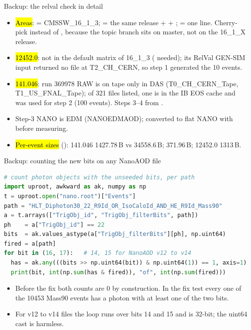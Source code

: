 \begin{frame}{Backup: the relval check in detail}
  \begin{itemize}\small
    \item \hl{Areas}:  = CMSSW\_16\_1\_3;  = the same release + 
          + ;  = one line. Cherry-pick instead of
          , because the topic branch sits on master, not on the 16\_1\_X release.
    \item \hl{12452.0}: not in the default matrix of 16\_1\_3 ( needed); its RelVal GEN-SIM input returned
          no file at T2\_CH\_CERN, so step 1 generated the 10 events.
    \item \hl{141.046}: run 369978 RAW is on tape only in DAS (T0\_CH\_CERN\_Tape, T1\_US\_FNAL\_Tape); of 321 files listed,
          one is in the IB EOS cache and was used for step 2 (100 events). Steps 3--4 from .
    \item Step-3 NANO is EDM (NANOEDMAOD); converted to flat NANO with  before measuring.
    \item \hl{Per-event sizes} (): 141.046  1427.78\,B vs
           34558.6\,B;  371.96\,B; 12452.0
           1313\,B.
  \end{itemize}
\end{frame}

\begin{frame}[fragile]{Backup: counting the new bits on any NanoAOD file}
\begin{lstlisting}[language=Python]
# count photon objects with the unseeded bits, per path
import uproot, awkward as ak, numpy as np
t = uproot.open("nano.root")["Events"]
path = "HLT_Diphoton30_22_R9Id_OR_IsoCaloId_AND_HE_R9Id_Mass90"
a = t.arrays(["TrigObj_id", "TrigObj_filterBits", path])
ph    = a["TrigObj_id"] == 22
bits  = ak.values_astype(a["TrigObj_filterBits"][ph], np.uint64)
fired = a[path]
for bit in (16, 17):   # 14, 15 for NanoAOD v12 to v14
  has = ak.any(((bits >> np.uint64(bit)) & np.uint64(1)) == 1, axis=1)
  print(bit, int(np.sum(has & fired)), "of", int(np.sum(fired)))
\end{lstlisting}
  \begin{itemize}\small
    \item Before the fix both counts are 0 by construction. In the fix test every one of the 10453 Mass90 events has a
          photon with at least one of the two bits.
    \item For v12 to v14 files the loop runs over bits 14 and 15 and  is 32-bit; the uint64 cast is harmless.
  \end{itemize}
\end{frame}

